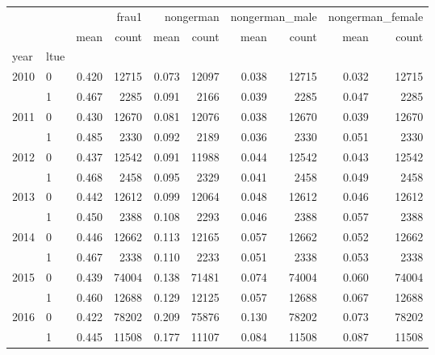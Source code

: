 \begin{tabular}{llrrrrrrrr}
\toprule
 &  & \multicolumn{2}{r}{frau1} & \multicolumn{2}{r}{nongerman} & \multicolumn{2}{r}{nongerman_male} & \multicolumn{2}{r}{nongerman_female} \\
 &  & mean & count & mean & count & mean & count & mean & count \\
year & ltue &  &  &  &  &  &  &  &  \\
\midrule
\multirow[t]{2}{*}{2010} & 0 & 0.420 & 12715 & 0.073 & 12097 & 0.038 & 12715 & 0.032 & 12715 \\
 & 1 & 0.467 & 2285 & 0.091 & 2166 & 0.039 & 2285 & 0.047 & 2285 \\
\cline{1-10}
\multirow[t]{2}{*}{2011} & 0 & 0.430 & 12670 & 0.081 & 12076 & 0.038 & 12670 & 0.039 & 12670 \\
 & 1 & 0.485 & 2330 & 0.092 & 2189 & 0.036 & 2330 & 0.051 & 2330 \\
\cline{1-10}
\multirow[t]{2}{*}{2012} & 0 & 0.437 & 12542 & 0.091 & 11988 & 0.044 & 12542 & 0.043 & 12542 \\
 & 1 & 0.468 & 2458 & 0.095 & 2329 & 0.041 & 2458 & 0.049 & 2458 \\
\cline{1-10}
\multirow[t]{2}{*}{2013} & 0 & 0.442 & 12612 & 0.099 & 12064 & 0.048 & 12612 & 0.046 & 12612 \\
 & 1 & 0.450 & 2388 & 0.108 & 2293 & 0.046 & 2388 & 0.057 & 2388 \\
\cline{1-10}
\multirow[t]{2}{*}{2014} & 0 & 0.446 & 12662 & 0.113 & 12165 & 0.057 & 12662 & 0.052 & 12662 \\
 & 1 & 0.467 & 2338 & 0.110 & 2233 & 0.051 & 2338 & 0.053 & 2338 \\
\cline{1-10}
\multirow[t]{2}{*}{2015} & 0 & 0.439 & 74004 & 0.138 & 71481 & 0.074 & 74004 & 0.060 & 74004 \\
 & 1 & 0.460 & 12688 & 0.129 & 12125 & 0.057 & 12688 & 0.067 & 12688 \\
\cline{1-10}
\multirow[t]{2}{*}{2016} & 0 & 0.422 & 78202 & 0.209 & 75876 & 0.130 & 78202 & 0.073 & 78202 \\
 & 1 & 0.445 & 11508 & 0.177 & 11107 & 0.084 & 11508 & 0.087 & 11508 \\
\cline{1-10}
\bottomrule
\end{tabular}
